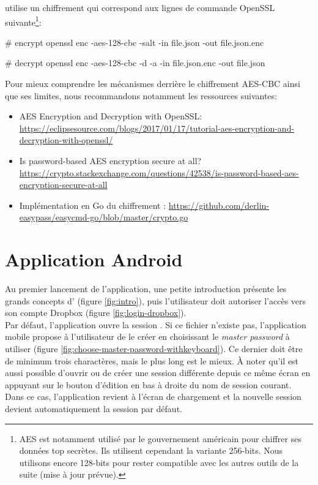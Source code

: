 \easypass{} utilise un chiffrement qui correspond aux lignes de commande OpenSSL suivante\footnote{AES est notamment utilisé par le gouvernement américain pour chiffrer ses données top secrètes. Ils utilisent cependant la variante 256-bits. Nous utilisons encore 128-bits pour rester compatible avec les autres outils de la suite (mise à jour prévue).}:

\begin{bashcode}
# encrypt
openssl enc -aes-128-cbc -salt -in file.json -out file.json.enc  

# decrypt
openssl enc -aes-128-cbc -d -a -in file.json.enc -out file.json 
\end{bashcode}


Pour mieux comprendre les mécanismes derrière le chiffrement AES-CBC ainsi que ses limites, nous recommandons notamment les ressources suivantes:

\begin{itemize}
    \item AES Encryption and Decryption with OpenSSL: \url{https://eclipsesource.com/blogs/2017/01/17/tutorial-aes-encryption-and-decryption-with-openssl/}
    \item Is password-based AES encryption secure at all? \url{https://crypto.stackexchange.com/questions/42538/is-password-based-aes-encryption-secure-at-all}
    \item Implémentation en Go du chiffrement \easypass{}: \url{https://github.com/derlin-easypass/easycmd-go/blob/master/crypto.go}
\end{itemize}

\section{Application Android}

Au premier lancement de l'application, une petite introduction présente les grands concepts d'\easypass{} (figure \ref{fig:intro}), puis l'utilisateur doit autoriser l'accès vers son compte Dropbox (figure \ref{fig:login-dropbox}).\\ 
Par défaut, l'application ouvre la session . Si ce fichier n'existe pas, l'application mobile propose à l'utilisateur de le créer en choisissant le \emph{master password} à utiliser (figure \ref{fig:choose-master-password-withkeyboard}). Ce dernier doit être de minimum trois charactères, mais le plus long est le mieux. À noter qu'il est aussi possible d'ouvrir ou de créer une session différente depuis ce même écran en appuyant sur le bouton d'édition en bas à droite du nom de session courant. Dans ce cas, l'application revient à l'écran de chargement et la nouvelle session devient automatiquement la session par défaut.

